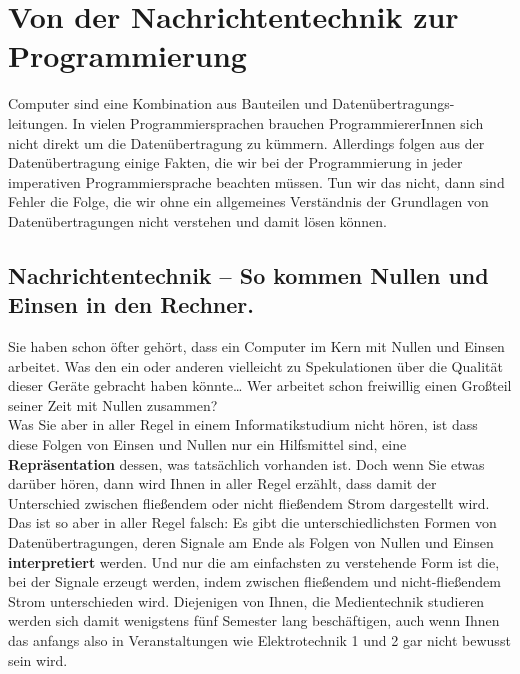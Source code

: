 \chapter[Nachrichtentechnik und Programmierung]{Von der Nachrichtentechnik zur Programmierung}

Computer sind eine Kombination aus Bauteilen und Datenübertragungs-leitungen. In vielen Programmiersprachen brauchen ProgrammiererInnen sich nicht direkt um die Datenübertragung zu kümmern. Allerdings folgen aus der Datenübertragung einige Fakten, die wir bei der Programmierung in jeder imperativen Programmiersprache beachten müssen. Tun wir das nicht, dann sind Fehler die Folge, die wir ohne ein allgemeines Verständnis der Grundlagen von Datenübertragungen nicht verstehen und damit lösen können.

\section{Nachrichtentechnik – So kommen Nullen und \\ Einsen in den Rechner.}

Sie haben schon öfter gehört, dass ein Computer im Kern mit Nullen und Einsen arbeitet. Was den ein oder anderen vielleicht zu Spekulationen über die Qualität dieser Geräte gebracht haben könnte… Wer arbeitet schon freiwillig einen Großteil seiner Zeit mit Nullen zusammen?\\

Was Sie aber in aller Regel in einem Informatikstudium nicht hören, ist dass diese Folgen von Einsen und Nullen nur ein Hilfsmittel sind, eine \textbf{Repräsentation} dessen, was tatsächlich vorhanden ist. Doch wenn Sie etwas darüber hören, dann wird Ihnen in aller Regel erzählt, dass damit der Unterschied zwischen fließendem oder nicht fließendem Strom dargestellt wird. Das ist so aber in aller Regel falsch: Es gibt die unterschiedlichsten Formen von Datenübertragungen, deren Signale am Ende als Folgen von Nullen und Einsen \textbf{interpretiert} werden. Und nur die am einfachsten zu verstehende Form ist die, bei der Signale erzeugt werden, indem zwischen fließendem und nicht-fließendem Strom unterschieden wird. Diejenigen von Ihnen, die Medientechnik studieren werden sich damit wenigstens fünf Semester lang beschäftigen, auch wenn Ihnen das anfangs also in Veranstaltungen wie Elektrotechnik 1 und 2 gar nicht bewusst sein wird.\\

